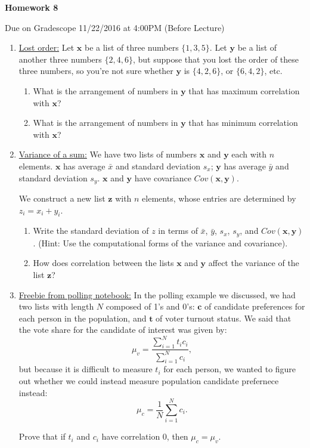 \documentclass[11pt]{article}
\begin{document}
\centerline{\textbf{Homework 8}}
\centerline{Due on Gradescope 11/22/2016 at 4:00PM (Before Lecture)}

\begin{enumerate}
\item \underline{Lost order:} Let $\bm x$ be a list of three numbers $\{1, 3, 5\}$. Let $\bm y$ be a list of another three numbers $\{2, 4, 6\}$, but
suppose that you lost the order of these three numbers, so you're not sure whether $\bm y$ is $\{4, 2, 6\}$, or $\{6, 4, 2\}$, etc.
    \begin{enumerate}
        \item What is the arrangement of numbers in $\bm y$ that has maximum correlation with $\bm x$?
        \item What is the arrangement of numbers in $\bm y$ that has minimum correlation with $\bm x$?
    \end{enumerate}

\item \underline{Variance of a sum:}
We have two lists of numbers $\bm x$ and $\bm y$ each with $n$ elements. $\bm x$ has average $\bar x$ and standard deviation $s_x$;
$\bm y$ has average $\bar y$ and standard deviation $s_y$.
$\bm x$ and $\bm y$ have covariance $Cov(\bm x, \bm y)$.

 We construct a new list $\bm z$ with $n$ elements, whose entries are determined by $z_i = x_i + y_i$.

\begin{enumerate}
\item Write the standard deviation of $z$ in terms of $\bar x$, $\bar y$, $s_x$, $s_y$, and $Cov(\bm x, \bm y)$.
    (Hint: Use the computational forms of the variance and covariance).
\item How does correlation between the lists $\bm x$ and $\bm y$ affect the variance of the list $\bm z$?
\end{enumerate}

\item \underline{Freebie from polling notebook:}
In the polling example we discussed, we had two lists with length $N$ composed of 1's and 0's: $\bm c$ of candidate preferences for each person in the population, and $\bm t$ of voter turnout status.
We said that the vote share for the candidate of interest was given by:
$$
\mu_v = \frac{\sum_{i=1}^N t_i c_i}{\sum_{i=1}^N c_i},
$$
but because it is difficult to measure $t_i$ for each person, we wanted to figure out whether we could instead measure population candidate prefernece instead:
$$
\mu_c = \frac{1}{N} \sum_{i=1}^N c_i.
$$

Prove that if $t_i$ and $c_i$ have correlation 0, then $\mu_c = \mu_v$.
\end{enumerate}
\end{document}

